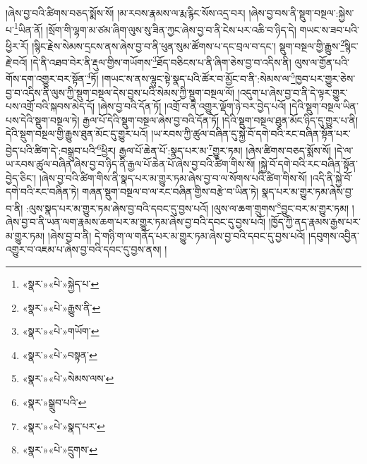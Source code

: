 །ཞེས་བྱ་བའི་ཚིགས་བཅད་སྨོས་སོ། །མ་རབས་རྣམས་ལ་རྨ་རྙིང་སོས་འདྲ་བར། །ཞེས་བྱ་བས་ནི་སྡུག་བསྔལ་:སྐྱེས་པ་\footnote{«སྣར་»«པེ་»སྐྱེད་པ་}ཡིན་ནོ། །སྲོག་གི་ལྷག་མ་ཙམ་ཞིག་ལུས་སུ་ཟིན་ཀྱང་ཞེས་བྱ་བ་ནི་ངེས་པར་འཆི་བ་ཉིད་དེ། གཡང་ས་ཟབ་པའི་ཕྱིར་རོ། །སྙིང་རྗེས་སེམས་དྲངས་ནས་ཞེས་བྱ་བ་ནི་ཕུན་སུམ་ཚོགས་པ་དང་བྲལ་བ་དང་། སྡུག་བསྔལ་གྱི་རྒྱུས་\footnote{«སྣར་»«པེ་»རྒྱུས་ནི་}སྙིང་རྗེ་བའོ། །དེ་ནི་འཐབ་བེར་ནི་རྡུལ་གྱིས་གཡོགས་\footnote{«སྣར་»«པེ་»གཡོག་}ཐོད་བཅིངས་པ་ནི་ཞིག་ཅེས་བྱ་བ་འདིས་ནི། ལུས་ལ་གྱོན་པའི་གོས་དག་འགྱུར་བར་སྟོན་\footnote{«སྣར་»«པེ་»བསྟན་}ཏོ། །གཡང་ས་ནས་ལྷུང་སྟེ་སྣད་པའི་ཚོར་བ་མྱོང་བ་ནི་:སེམས་ལ་\footnote{«སྣར་»«པེ་»སེམས་ལས་}ཁྱབ་པར་གྱུར་ཅེས་བྱ་བ་འདིས་ནི་ལུས་ཀྱི་སྡུག་བསྔལ་དེས་བྱས་པའི་སེམས་ཀྱི་སྡུག་བསྔལ་ལོ། །འདུག་པ་ཞེས་བྱ་བ་ནི་དེ་ལྟར་གྱུར་པས་འགྲོ་བའི་སྐབས་མེད་དོ། །ཞེས་བྱ་བའི་དོན་ཏོ། །འགྲོ་བ་ནི་འགྱུར་ལྡོག་ཉེ་བར་བྱེད་པའོ། །དེའི་སྡུག་བསྔལ་ཡིན་པས་དེའི་སྡུག་བསྔལ་ཏེ། རྒྱལ་པོ་དེའི་སྡུག་བསྔལ་ཞེས་བྱ་བའི་དོན་ཏོ། །དེའི་སྡུག་བསྔལ་ཐུན་མོང་ཉིད་དུ་གྱུར་པ་ནི། དེའི་སྡུག་བསྔལ་གྱི་རྒྱུས་ཐུན་མོང་དུ་གྱུར་པའོ། །ཡ་རབས་ཀྱི་ཚུལ་བཞིན་དུ་སྐྱེ་བོ་དགེ་བའི་རང་བཞིན་སྟོན་པར་བྱེད་པའི་ཚིག་དེ་:བསྒྲུབ་པའི་\footnote{«སྣར་»སྒྲུབ་པའི་}ཕྱིར། རྒྱལ་པོ་ཆེན་པོ་:སྣད་པར་མ་\footnote{«སྣར་»«པེ་»སྣད་པར་}གྱུར་ཏམ། །ཞེས་ཚིགས་བཅད་སྨོས་སོ། །དེ་ལ་ཡ་རབས་ཚུལ་བཞིན་ཞེས་བྱ་བ་ཉིད་ནི་རྒྱལ་པོ་ཆེན་པོ་ཞེས་བྱ་བའི་ཚིག་གིས་སོ། །སྐྱེ་བོ་དགེ་བའི་རང་བཞིན་སྟོན་བྱེད་ཅིང་། །ཞེས་བྱ་བའི་ཚིག་གིས་ནི་སྣད་པར་མ་གྱུར་ཏམ་ཞེས་བྱ་བ་ལ་སོགས་པའི་ཚིག་གིས་སོ། །འདི་ནི་སྐྱེ་བོ་དགེ་བའི་རང་བཞིན་ཏེ། གཞན་སྡུག་བསྔལ་བ་ལ་རང་བཞིན་གྱིས་བརྩེ་བ་ཡིན་ཏེ། སྣད་པར་མ་གྱུར་ཏམ་ཞེས་བྱ་བ་ནི། :ལུས་སྣད་པར་མ་གྱུར་ཏམ་ཞེས་བྱ་བའི་དབང་དུ་བྱས་པའོ། །ལུས་ལ་ཆག་གྲུགས་\footnote{«སྣར་»«པེ་»དྲུགས་}བྱུང་བར་མ་གྱུར་ཏམ། །ཞེས་བྱ་བ་ནི་ཡན་ལག་རྣམས་ཆག་པར་མ་གྱུར་ཏམ་ཞེས་བྱ་བའི་དབང་དུ་བྱས་པའོ། །ཁྱོད་ཀྱི་ནད་རྣམས་རྒྱས་པར་མ་གྱུར་ཏམ། །ཞེས་བྱ་བ་ནི། དེ་གཉི་ག་ལ་གནོད་པར་མ་གྱུར་ཏམ་ཞེས་བྱ་བའི་དབང་དུ་བྱས་པའོ། །དབུགས་འབྱིན་འགྱུར་བ་འཇམ་པ་ཞེས་བྱ་བའི་དབང་དུ་བྱས་ནས། །
